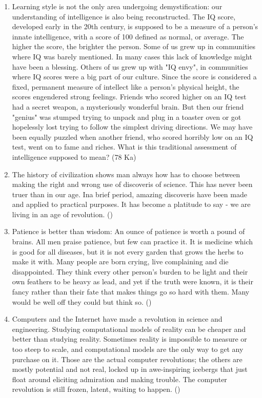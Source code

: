 \documentclass[12pt]{article}
\begin{document}
\begin{enumerate}
    \item Learning style is not the only area undergoing demystification: our understanding of intelligence is also being reconstructed. The IQ score, developed early in the 20th century, is supposed to be a measure of a person's innate intelligence, with a score of 100 defined as normal, or average. The higher the score, the brighter the person. Some of us grew up in communities where IQ was barely mentioned. In many cases this lack of knowledge might have been a blessing. Others of us grew up with "IQ envy", in communities where IQ scores were a big part of our culture. Since the score is considered a fixed, permanent measure of intellect like a person's physical height, the scores engendered strong feelings. Friends who scored higher on an IQ test had a secret weapon, a mysteriously wonderful brain. But then our friend "genius" was stumped trying to unpack and plug in a toaster oven or got hopelessly lost trying to follow the simplest driving directions. We may have been equally puzzled when another friend, who scored horribly low on an IQ test, went on to fame and riches. What is this traditional assessment of intelligence supposed to mean? \hfill (78 Ka)

    \item The history of civilization shows man always how has to choose between making the right and wrong use of discoveris of science. This has never been truer than in our age. Ina  brief period, amazing discoveris have been made and applied to practical purposes. It has become a platitude to say - we are living in an age of revolution. \hfill ()

    \item Patience is better than wisdom: An ounce of patience is worth a pound of brains. All men praise patience, but few can practice it. It is medicine which is good for all diseases, but it is not every garden that grows the herbs to make it with. Many people are born crying, live complaining and die disappointed. They think every other person's burden to be light and their own feathers to be heavy as lead, and yet if the truth were known, it is their fancy rather than their fate that makes things go so hard with them. Many would be well off they could but think so. \hfill ()

    \item Computers and the Internet have made a revolution in science and engineering. Studying computational models of reality can be cheaper and better than studying reality. Sometimes reality is impossible to measure or too steep to scale, and computational models are the only way to get any purchase on it. Those are the actual computer revolutions; the others are mostly potential and not real, locked up in awe-inspiring icebergs that just float around eliciting admiration and making trouble. The computer revolution is still frozen, latent, waiting to happen. \hfill ()


\end{enumerate}
\end{document}
